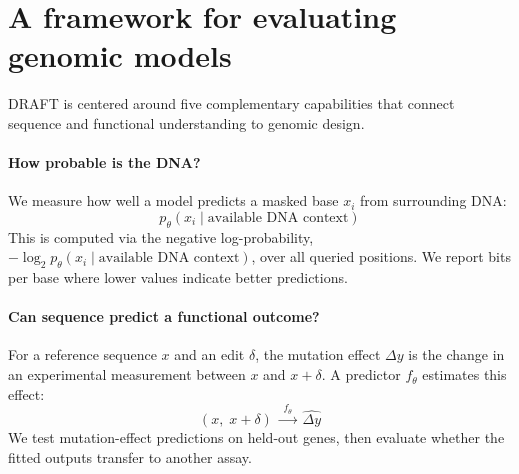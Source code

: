 
\FloatBarrier




\section{A framework for evaluating genomic models}
\label{sec:questions}

DRAFT is centered around five complementary capabilities that connect sequence and functional understanding to genomic design. %

\begingroup
\setlength{\abovedisplayskip}{5pt plus 1pt minus 2pt}
\setlength{\belowdisplayskip}{5pt plus 1pt minus 2pt}
\setlength{\abovedisplayshortskip}{0pt plus 1pt}
\setlength{\belowdisplayshortskip}{3pt plus 1pt minus 1pt}
\paragraph{ How probable is the DNA?}
We measure how well a model predicts a masked base $x_i$ from surrounding DNA:
\begin{equation}
    p_\theta\!\left(x_i \mid \text{available DNA context}\right)
    \label{eq:sequence-prior}
\end{equation}
This is computed via the negative log-probability, $-\log_2 p_\theta(x_i\mid\text{available DNA context})$, over all queried positions. We report bits per base where lower values indicate better predictions.






\paragraph{ Can sequence predict a functional outcome?}
For a reference sequence $x$ and an edit $\delta$, the mutation
effect $\Delta y$ is the change in an experimental measurement between
$x$ and $x+\delta$. A predictor $f_\theta$ estimates this effect:
\begin{equation}
    (x,\;x+\delta)
    \;\xrightarrow{\;f_\theta\;}\;
    \widehat{\Delta y}
    \label{eq:functional-prediction}
\end{equation}
We test mutation-effect predictions on held-out genes, then evaluate whether the fitted outputs transfer to another assay. %

